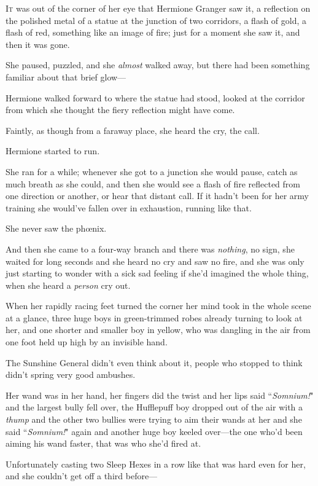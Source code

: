 
\lettrine{I}{t} was out of the corner of her eye that Hermione Granger saw it, a reflection on the polished metal of a statue at the junction of two corridors, a flash of gold, a flash of red, something like an image of fire; just for a moment she saw it, and then it was gone.

She paused, puzzled, and she \emph{almost} walked away, but there had been something familiar about that brief glow—

Hermione walked forward to where the statue had stood, looked at the corridor from which she thought the fiery reflection might have come.

Faintly, as though from a faraway place, she heard the cry, the call.

Hermione started to run.

She ran for a while; whenever she got to a junction she would pause, catch as much breath as she could, and then she would see a flash of fire reflected from one direction or another, or hear that distant call. If it hadn't been for her army training she would've fallen over in exhaustion, running like that.

She never saw the phœnix.

And then she came to a four-way branch and there was \emph{nothing}, no sign, she waited for long seconds and she heard no cry and saw no fire, and she was only just starting to wonder with a sick sad feeling if she'd imagined the whole thing, when she heard a \emph{person} cry out.

When her rapidly racing feet turned the corner her mind took in the whole scene at a glance, three huge boys in green-trimmed robes already turning to look at her, and one shorter and smaller boy in yellow, who was dangling in the air from one foot held up high by an invisible hand.

The Sunshine General didn't even think about it, people who stopped to think didn't spring very good ambushes.

Her wand was in her hand, her fingers did the twist and her lips said ``\emph{Somnium!}" and the largest bully fell over, the Hufflepuff boy dropped out of the air with a \emph{thump} and the other two bullies were trying to aim their wands at her and she said ``\emph{Somnium!}" again and another huge boy keeled over—the one who'd been aiming his wand faster, that was who she'd fired at.

Unfortunately casting two Sleep Hexes in a row like that was hard even for her, and she couldn't get off a third before—

